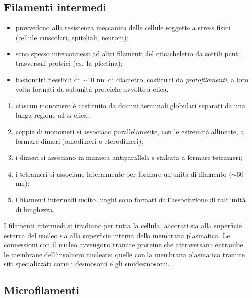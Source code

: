 \subsection{Filamenti intermedi}

\begin{itemize}
  \item provvedono alla resistenza meccanica delle cellule soggette a stress fisici (cellule muscolari, epiteliali, neuroni);
  \item sono spesso interconnessi ad altri filamenti del citoscheletro da sottili ponti trasversali proteici (es.\ la plectina);
  \item bastoncini flessibili di $\sim$10 nm di diametro, costituiti da \textit{protofilamenti}, a loro volta formati da subunità proteiche avvolte a elica.
\end{itemize}

\begin{enumerate}
  \item ciascun monomero è costituito da domini terminali globulari separati da una lunga regione ad $\alpha$-elica;
  \item coppie di monomeri si associano parallelamente, con le estremità allineate, a formare dimeri (omodimeri o eterodimeri);
  \item i dimeri si associano in maniera antiparallela e sfalsata a formare tetrameri;
  \item i tetrameri si associano lateralmente per formare un'unità di filamento ($\sim$60 nm);
  \item i filamenti intermedi molto lunghi sono formati dall'associazione di tali unità di lunghezza.
\end{enumerate}

I filamenti intermedi si irradiano per tutta la cellula, ancorati sia alla superficie esterna del nucleo sia alla superficie interna della membrana plasmatica. Le connessioni con il nucleo avvengono tramite proteine che attraversano entrambe le membrane dell'involucro nucleare; quelle con la membrana plasmatica tramite siti specializzati come i desmosomi e gli emidesmosomi.

\subsection{Microfilamenti}

